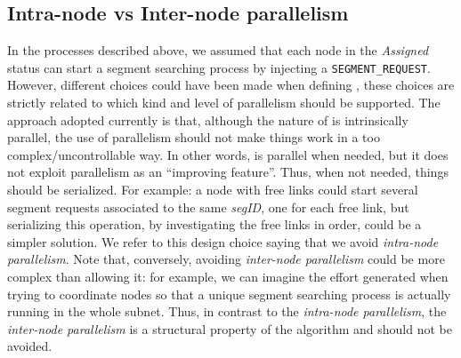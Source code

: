 \subsection{Intra-node vs Inter-node parallelism}
In the processes described above, we assumed that each node in the
\emph{Assigned} status can start a segment searching process by
injecting a \texttt{SEGMENT\_REQUEST}. However, different choices
could have been made when defining \disr{}, these choices are strictly related to which
kind and level of parallelism should be supported. The approach adopted
currently is that, although the nature of \disr{} is intrinsically
parallel, the use of parallelism should not make things work in a too
complex/uncontrollable way. In other words, \disr{} is parallel when
needed, but it does not exploit parallelism as an ``improving
feature''. Thus, when not needed, things should be serialized. For
example: a node with free links could start several segment requests
associated to the same \emph{segID}, one for each free link, but
serializing this operation, by investigating the free links in order,
could be a simpler solution. We refer to this \disr{} design choice
saying that we avoid \emph{intra-node parallelism}.  Note that,
conversely, avoiding \emph{inter-node parallelism} could be more
complex than allowing it: for example, we can imagine the effort
generated when trying to coordinate nodes so that a unique segment
searching process is actually running in the whole subnet. Thus, in
contrast to the \emph{intra-node parallelism}, the \emph{inter-node
parallelism} is a structural property of the \disr{} algorithm and
should not be avoided.
